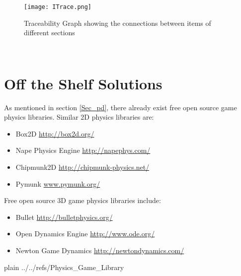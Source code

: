 \documentclass[12pt]{article}
\begin{document}
\begin{figure}[h!]
	\begin{center}
		\texttt{[image: ITrace.png]}
		\bigskip
		\caption{Traceability Graph showing the connections between items of different sections}
		\label{Fig_ITrace}
	\end{center}
\end{figure}

~\newpage
\section{Off the Shelf Solutions}   \label{sec_otss}

As mentioned in section \ref{Sec_pd}, there already exist free open source game
physics libraries. Similar 2D physics libraries are:
\begin{itemize} 
\item Box2D   \url{http://box2d.org/}
\item Nape Physics Engine  \url{http://napephys.com/}
\item Chipmunk2D \url{http://chipmunk-physics.net/}
\item Pymunk \url{www.pymunk.org/}
\end{itemize}

\noindent
Free open source 3D game physics libraries include:
\begin{itemize} 
\item Bullet   \url{http://bulletphysics.org/}
\item Open Dynamics Engine  \url{http://www.ode.org/}
\item Newton Game Dynamics  \url{http://newtondynamics.com/}
\end{itemize}


 {plain}
 {../../refs/Physics_Game_Library}


\end{document}

